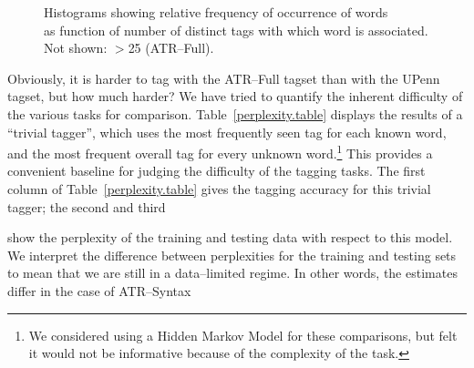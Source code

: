 \begin{figure}
\begin{center}
\end{center}
\caption{Histograms showing relative frequency of occurrence of words\\
as function of number of distinct tags with which word is associated.\\
Not shown: $>$25 (ATR--Full).
\label{tagsperword}}
\vspace{3mm}
\end{figure}

Obviously, it is harder to tag with the ATR--Full tagset than with the
UPenn tagset, but how much harder? We have tried to quantify the
inherent difficulty of the various tasks for comparison.
Table~\ref{perplexity.table} displays the results of a ``trivial
tagger'', which uses the most frequently seen tag for each known word,
and the most frequent overall tag for every unknown word.\footnote{ We
considered using a Hidden Markov Model for these comparisons, but felt
it would not be informative because of the complexity of the task.}
This provides a convenient baseline for judging the difficulty of the
tagging tasks.  The first column\hspace{0.4mm} of\hspace{0.4mm}
Table~\ref{perplexity.table}\hspace{0.4mm} gives\hspace{0.4mm}
the\hspace{0.4mm} tagging\hspace{0.4mm} accuracy\hspace{0.4mm}
for\hspace{0.4mm} this\hspace{0.4mm} trivial\hspace{0.4mm}
tagger;\hspace{0.4mm} the\hspace{0.4mm} second\hspace{0.4mm}
and\hspace{0.4mm} third

\noindent show the perplexity of the training and testing data with respect to
this model.  We interpret the difference between perplexities for the
training and testing sets to mean that we are still in\hspace{0.4mm}
a\hspace{0.4mm} data--limited\hspace{0.4mm}
regime.\hspace{0.4mm}  In\hspace{0.4mm} other\hspace{0.4mm}
words,\hspace{0.4mm} the\hspace{0.4mm} estimates\hspace{0.4mm}
differ\hspace{0.4mm} in\hspace{0.4mm} the\hspace{0.4mm}
case\hspace{0.4mm} of\hspace{0.4mm}
ATR--Syntax

